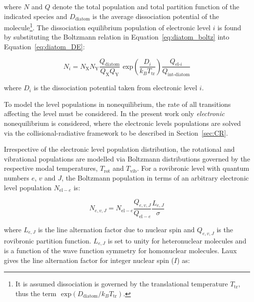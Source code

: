 \noindent where $N$ and $Q$ denote the total population and total partition function of the indicated species and $D_\text{diatom}$ is the average dissociation potential of the molecule\footnote{It is assumed dissociation is governed by the translational temperature $T_\text{tr}$, thus the term $\text{~exp} ( D_\text{diatom} / k_B T_\text{tr} )$. }.
The dissociation equilibrium population of electronic level $i$ is found by substituting the Boltzmann relation in Equation~\ref{eq:diatom_boltz} into Equation~\ref{eq:diatom_DE}:

\begin{equation}
 N_i =  N_\text{X} N_\text{Y} \frac{ Q_\text{diatom} }{ Q_\text{X} Q_\text{Y} }  \text{~exp} \left ( \frac{D_{i}}{k_B T_\text{tr}} \right )  \frac{ Q_{\text{el-}i} }{ Q_\text{int-diatom} } \label{eq:diatom_i_DE}
\end{equation} 

\noindent where $D_i$ is the dissociation potential taken from electronic level $i$.

\par

To model the level populations in nonequilibrium, the rate of all transitions affecting the level must be considered.
In the present work only \textit{electronic} nonequilibrium is considered, where the electronic levels populations are solved via the collisional-radiative framework to be described in Section~\ref{sec:CR}.

\par

Irrespective of the electronic level population distribution, the rotational and vibrational populations are modelled via Boltzmann distributions governed by the respective modal temperatures, $T_\text{rot}$ and $T_\text{vib}$.
For a rovibronic level with quantum numbers $e$, $v$ and $J$, the Boltzmann population in terms of an arbitrary electronic level population $N_{\text{el}-e} $ is:

\begin{equation}
 N_{e,v,J} = N_{\text{el}-e} \frac{ Q_{e,v,J} }{ Q_{\text{el}-e} } \frac{L_{e,J}}{\sigma} \label{eq:N_evJ}
\end{equation}

\noindent where $L_{e,J}$ is the line alternation factor due to nuclear spin and $Q_{e,v,J}$ is the rovibronic partition function.
$L_{e,J}$ is set to unity for heteronuclear molecules and is a function of the wave function symmetry for homonuclear molecules.
Laux~\cite{laux_2002} gives the line alternation factor for integer nuclear spin ($I$) as:

